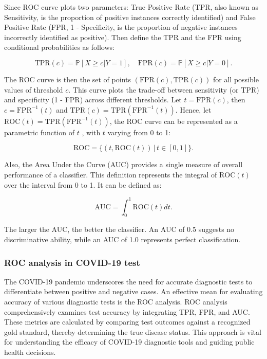 \documentclass{article}\usepackage[]{graphicx}\usepackage[]{xcolor}
\numberwithin{equation}{section}
\begin{document}
\noindent
Since ROC curve plots two parameters\cite{rocAnalysis}: True Positive Rate (TPR, also known as Sensitivity, is the proportion of positive instances correctly identified) and False Positive Rate (FPR, 1 - Specificity, is the proportion of negative instances incorrectly identified as positive). Then define the TPR and the FPR using conditional probabilities as follows\cite{Pepe2003}:

\[ \text{TPR}(c) = \mathbb{P}[X \geq c | Y = 1], \quad \text{FPR}(c) = \mathbb{P}[X \geq c | Y = 0].\]

\noindent
The ROC curve is then the set of points $(\text{FPR}(c), \text{TPR}(c))$ for all possible values of threshold $c$. This curve plots the trade-off between sensitivity (or TPR) and specificity (1 - FPR) across different thresholds. Let $t=\text{FPR}(c)$, then $c = \text{FPR}^{-1}(t)$ and $\text{TPR}(c)= \text{TPR}(\text{FPR}^{-1}(t))$. Hence, let $\text{ROC}(t)= \text{TPR}(\text{FPR}^{-1}(t))$, the ROC curve can be represented as a parametric function of $t$\cite{Pepe2003} , with $t$ varying from 0 to 1:

\[ \text{ROC} = \{ (t, \text{ROC}(t)) \,|\, t \in [0, 1] \}.\]

\noindent
Also, the Area Under the Curve (AUC)\cite{Pepe2003}  provides a single measure of overall performance of a classifier. This definition represents the integral of $\text{ROC}(t)$ over the interval from 0 to 1. It can be defined as:

\[ \text{AUC} = \int_{0}^{1} \text{ROC}(t) dt.\]

\noindent
The larger the AUC, the better the classifier. An AUC of 0.5 suggests no discriminative ability, while an AUC of 1.0 represents perfect classification.

\subsubsection{ROC analysis in COVID-19 test}

The COVID-19 pandemic underscores the need for accurate diagnostic tests to differentiate between positive and negative cases\cite{Garcia2021ROCAlly}. An effective mean for evaluating accuracy of various diagnostic tests is the ROC analysis. ROC analysis comprehensively examines test accuracy by integrating TPR, FPR, and AUC. These metrics are calculated by comparing test outcomes against a recognized gold standard, thereby determining the true disease status. This approach is vital for understanding the efficacy of COVID-19 diagnostic tools and guiding public health decisions.\\
\end{document}
